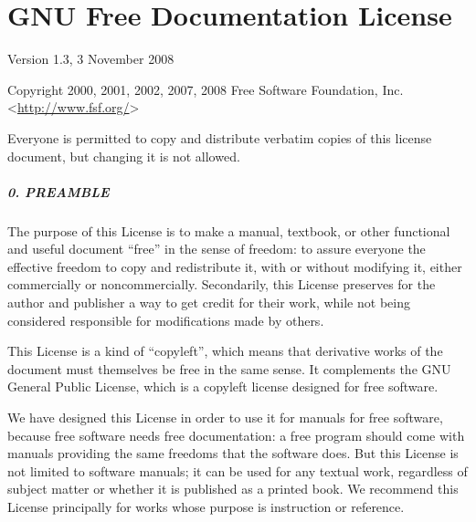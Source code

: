 \documentclass[10pt,]{book}
\theoremstyle{plain}
\theoremstyle{definition}
\theoremstyle{definition}
\theoremstyle{definition}
\numberwithin{equation}{chapter}
\begin{document}
\chapter[{GNU Free Documentation License}]{GNU Free Documentation License}\label{appendix-gfdl}
\hypertarget{p-2756}{}%
Version 1.3, 3 November 2008%
\par
\hypertarget{p-2757}{}%
Copyright \textcopyright{} 2000, 2001, 2002, 2007, 2008 Free Software Foundation, Inc. \textless{}\url{http://www.fsf.org/}\textgreater{}%
\par
\hypertarget{p-2758}{}%
Everyone is permitted to copy and distribute verbatim copies of this license document, but changing it is not allowed.%
\typeout{************************************************}
\typeout{************************************************}
\paragraph[{0. PREAMBLE}]{0. PREAMBLE}\hypertarget{gfdl-section0}{}
\hypertarget{p-2759}{}%
The purpose of this License is to make a manual, textbook, or other functional and useful document ``free'' in the sense of freedom: to assure everyone the effective freedom to copy and redistribute it, with or without modifying it, either commercially or noncommercially. Secondarily, this License preserves for the author and publisher a way to get credit for their work, while not being considered responsible for modifications made by others.%
\par
\hypertarget{p-2760}{}%
This License is a kind of ``copyleft'', which means that derivative works of the document must themselves be free in the same sense. It complements the GNU General Public License, which is a copyleft license designed for free software.%
\par
\hypertarget{p-2761}{}%
We have designed this License in order to use it for manuals for free software, because free software needs free documentation: a free program should come with manuals providing the same freedoms that the software does. But this License is not limited to software manuals; it can be used for any textual work, regardless of subject matter or whether it is published as a printed book. We recommend this License principally for works whose purpose is instruction or reference.%
\typeout{************************************************}
\typeout{************************************************}
\end{document}
